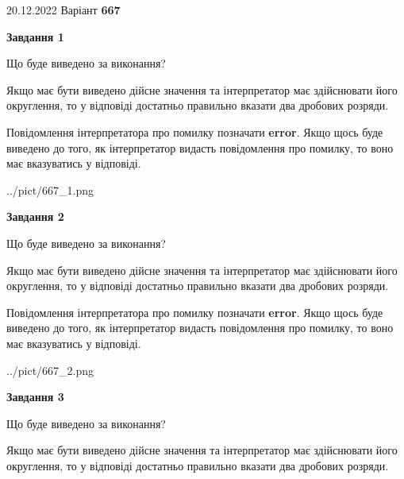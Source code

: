 \documentclass[12pt, ukrainian]{article}
\begin{document}
{20.12.2022 Варіант \No \textbf { 667 }\par}
{
\begin {Large}

{\begin {center}\textbf{Завдання 1}\end {center}}\par
Що буде виведено за виконання? \par

Якщо має бути виведено дійсне значення та інтерпретатор має здійснювати його округлення, 
то у відповіді достатньо правильно вказати два дробових розряди.

Повідомлення інтерпретатора про помилку позначати \textbf{error}.
Якщо щось буде виведено до того, як інтерпретатор видасть повідомлення про помилку, 
то воно має вказуватись у відповіді. \par

\begin{center}
	{../pict/667_1.png}
\end{center}
\newpage

{\begin {center}\textbf{Завдання 2}\end {center}}\par
Що буде виведено за виконання? \par

Якщо має бути виведено дійсне значення та інтерпретатор має здійснювати його округлення, 
то у відповіді достатньо правильно вказати два дробових розряди.

Повідомлення інтерпретатора про помилку позначати \textbf{error}.
Якщо щось буде виведено до того, як інтерпретатор видасть повідомлення про помилку, 
то воно має вказуватись у відповіді. \par

\begin{center}
	{../pict/667_2.png}
\end{center}
\newpage

{\begin {center}\textbf{Завдання 3}\end {center}}\par
Що буде виведено за виконання? \par

Якщо має бути виведено дійсне значення та інтерпретатор має здійснювати його округлення, 
то у відповіді достатньо правильно вказати два дробових розряди.


\end{Large}}
\end{document}

